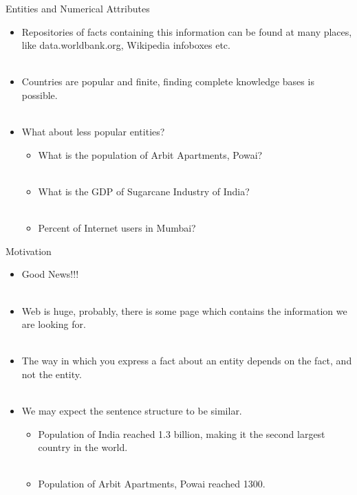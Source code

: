 \documentclass{beamer}
\begin{document}
\begin{frame}{Entities and Numerical Attributes}
 
 \begin{itemize}
  \item Repositories of facts containing this information can be found at many places, like data.worldbank.org, Wikipedia infoboxes etc. \pause \\~\\
  \item Countries are popular and finite, finding complete knowledge bases is possible. \pause \\~\\
  \item What about less popular entities?  \pause 
    \begin{itemize}
      \item What is the population of Arbit Apartments, Powai? \pause \\~\\
      \item What is the GDP of Sugarcane Industry of India? \pause \\~\\
      \item Percent of Internet users in Mumbai? 
    \end{itemize}
 \end{itemize} 
\end{frame}
\begin{frame}{Motivation}

\begin{itemize}
 \item  Good News!!! \pause \\~\\
 \item  Web is huge, probably, there is some page which contains the information we are looking for. \pause \\~\\
 \item The way in which you express a fact about an entity depends on the fact, and not the entity. \pause \\~\\
 \item We may expect the sentence structure to be similar. \pause
 \begin{itemize}
    \item Population of India reached 1.3 billion, making it the second largest country in the world. \pause \\~\\
    \item Population of Arbit Apartments, Powai reached 1300.
 \end{itemize}
 
\end{itemize}
\end{frame}
\end{document}
